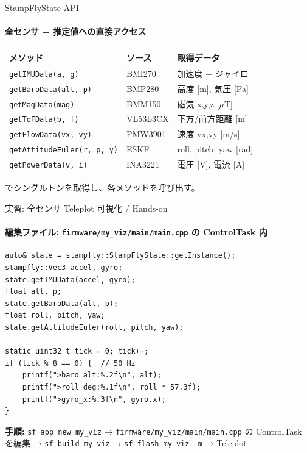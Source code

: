 \documentclass[aspectratio=169, 14pt]{beamer}
\begin{document}
\begin{frame}{StampFlyState API}
  \framesubtitle{全センサ + 推定値への直接アクセス}
  {\small
  \begin{tabular}{lll}
    \hline
    \textbf{メソッド} & \textbf{ソース} & \textbf{取得データ} \\
    \hline
    \texttt{getIMUData(a, g)}           & BMI270          & 加速度 + ジャイロ \\
    \texttt{getBaroData(alt, p)}        & BMP280          & 高度 [m], 気圧 [Pa] \\
    \texttt{getMagData(mag)}            & BMM150          & 磁気 x,y,z [$\mu$T] \\
    \texttt{getToFData(b, f)}           & VL53L3CX        & 下方/前方距離 [m] \\
    \texttt{getFlowData(vx, vy)}        & PMW3901         & 速度 vx,vy [m/s] \\
    \texttt{getAttitudeEuler(r, p, y)}  & ESKF            & roll, pitch, yaw [rad] \\
    \texttt{getPowerData(v, i)}         & INA3221         & 電圧 [V], 電流 [A] \\
    \hline
  \end{tabular}
  }

  \vspace{0.5em}
  {\footnotesize
     でシングルトンを取得し、各メソッドを呼び出す。
  }
\end{frame}

\begin{frame}[fragile]{実習: 全センサ Teleplot 可視化 / Hands-on}
  \framesubtitle{%
    編集ファイル: \texttt{firmware/my\_viz/main/main.cpp} の ControlTask 内}
  \begin{lstlisting}[style=sfcpp, basicstyle=\ttfamily\scriptsize]
auto& state = stampfly::StampFlyState::getInstance();
stampfly::Vec3 accel, gyro;
state.getIMUData(accel, gyro);
float alt, p;
state.getBaroData(alt, p);
float roll, pitch, yaw;
state.getAttitudeEuler(roll, pitch, yaw);

static uint32_t tick = 0; tick++;
if (tick % 8 == 0) {  // 50 Hz
    printf(">baro_alt:%.2f\n", alt);
    printf(">roll_deg:%.1f\n", roll * 57.3f);
    printf(">gyro_x:%.3f\n", gyro.x);
}
  \end{lstlisting}

  {\footnotesize
    \textbf{手順:} \texttt{sf app new my\_viz} → \texttt{firmware/my\_viz/main/main.cpp} の
    ControlTask を編集 → \texttt{sf build my\_viz} → \texttt{sf flash my\_viz -m} → Teleplot
  }
\end{frame}
\end{document}
